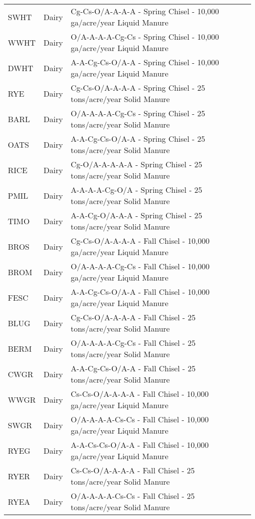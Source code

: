 \begin{landscape}
\begin{longtable}{l l l}
	\hline	\endlastfoot
  SWHT & Dairy & Cg-Cs-O/A-A-A-A - Spring Chisel - 10,000 ga/acre/year Liquid Manure  \\ 
  WWHT & Dairy & O/A-A-A-A-Cg-Cs - Spring Chisel - 10,000 ga/acre/year Liquid Manure  \\ 
  DWHT & Dairy & A-A-Cg-Cs-O/A-A - Spring Chisel - 10,000 ga/acre/year Liquid Manure  \\ 
  RYE & Dairy & Cg-Cs-O/A-A-A-A - Spring Chisel - 25 tons/acre/year Solid Manure  \\ 
  BARL & Dairy & O/A-A-A-A-Cg-Cs - Spring Chisel - 25 tons/acre/year Solid Manure  \\ 
  OATS & Dairy & A-A-Cg-Cs-O/A-A - Spring Chisel - 25 tons/acre/year Solid Manure  \\ 
  RICE & Dairy & Cg-O/A-A-A-A-A - Spring Chisel - 25 tons/acre/year Solid Manure  \\ 
  PMIL & Dairy & A-A-A-A-Cg-O/A - Spring Chisel - 25 tons/acre/year Solid Manure  \\ 
  TIMO & Dairy & A-A-Cg-O/A-A-A - Spring Chisel - 25 tons/acre/year Solid Manure  \\ 
  BROS & Dairy & Cg-Cs-O/A-A-A-A - Fall Chisel - 10,000 ga/acre/year Liquid Manure  \\ 
  BROM & Dairy & O/A-A-A-A-Cg-Cs - Fall Chisel - 10,000 ga/acre/year Liquid Manure  \\ 
  FESC & Dairy & A-A-Cg-Cs-O/A-A - Fall Chisel - 10,000 ga/acre/year Liquid Manure  \\ 
  BLUG & Dairy & Cg-Cs-O/A-A-A-A - Fall Chisel - 25 tons/acre/year Solid Manure  \\ 
  BERM & Dairy & O/A-A-A-A-Cg-Cs - Fall Chisel - 25 tons/acre/year Solid Manure  \\ 
  CWGR & Dairy & A-A-Cg-Cs-O/A-A - Fall Chisel - 25 tons/acre/year Solid Manure  \\ 
  WWGR & Dairy & Cs-Cs-O/A-A-A-A - Fall Chisel - 10,000 ga/acre/year Liquid Manure  \\ 
  SWGR & Dairy & O/A-A-A-A-Cs-Cs - Fall Chisel - 10,000 ga/acre/year Liquid Manure  \\ 
  RYEG & Dairy & A-A-Cs-Cs-O/A-A - Fall Chisel - 10,000 ga/acre/year Liquid Manure  \\ 
  RYER & Dairy & Cs-Cs-O/A-A-A-A - Fall Chisel - 25 tons/acre/year Solid Manure  \\ 
  RYEA & Dairy & O/A-A-A-A-Cs-Cs - Fall Chisel - 25 tons/acre/year Solid Manure  \\ 

\end{longtable}
\end{landscape}
